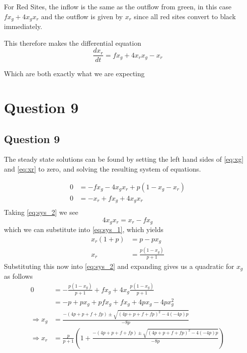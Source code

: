 \documentclass[11pt,a4paper]{article}
\begin{document}
For Red Sites, the inflow is the same as the outflow from green, in this case $f x_g + 4 x_g x_r $ and the outflow is given by $x_r$ since all red sites convert to black immediately.

This therefore makes the differential equation 
\begin{equation}\label{eq:xr}
\frac{d x_r}{d t} = f x_g + 4 x_r x_g - x_r
\end{equation}

Which are both exactly what we are expecting
\section{Question 9}
\label{sec:question9}


\subsection{Question 9}
\label{sec:question9:subsec:parta}
The steady state solutions can be found by setting the left hand sides of \eqref{eq:xg} and \eqref{eq:xr} to zero, and solving the resulting system of equations.

\begin{align}
0 &= - f x_g - 4 x_g x_r + p( 1-x_g - x_r) \label{eq:sys_1} \\
0 &= -x_r + f x_g + 4 x_g x_r  \label{eq:sys_2} \\
\end{align} 
Taking \eqref{eq:sys_2} we see
$$ 4 x_g x_r = x_r - f x_g $$
which we can substitute into \eqref{eq:sys_1}, which yields
\begin{align*}
x_r (1 + p) &= p - p x_g \\
x_r &= \frac{p(1-x_g)}{p+1}
\end{align*}
Substituting this now into \eqref{eq:sys_2} and expanding gives us a quadratic for $x_g$ as follows
\begin{align*}
0 &= - \frac{p(1-x_g)}{p+1} + f x_g + 4 x_g \frac{p(1-x_g)}{p+1} \\ 
&=  - p + p x_g + p f x_g + f x_g + 4 p x_g - 4 p x_g^2 \\
\Rightarrow x_g &= \frac{- (4 p + p + f + f p) \pm \sqrt{(4 p + p + f + f p)^2 - 4 (-4p) p }}{-8p} \\
\Rightarrow x_r &= \frac{p}{p+1} \left(1 + \frac{- (4 p + p + f + f p) \pm \sqrt{(4 p + p + f + f p)^2 - 4 (-4p) p }}{-8p} \right)
\end{align*}
\end{document}
